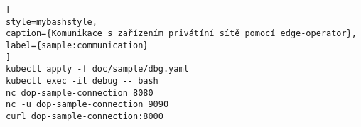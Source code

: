 \begin{lstfloat}
\begin{lstlisting}[
style=mybashstyle,
caption={Komunikace s zařízením privátíní sítě pomocí edge-operator},
label={sample:communication}
]
kubectl apply -f doc/sample/dbg.yaml
kubectl exec -it debug -- bash
nc dop-sample-connection 8080
nc -u dop-sample-connection 9090
curl dop-sample-connection:8000
\end{lstlisting}
\end{lstfloat}

